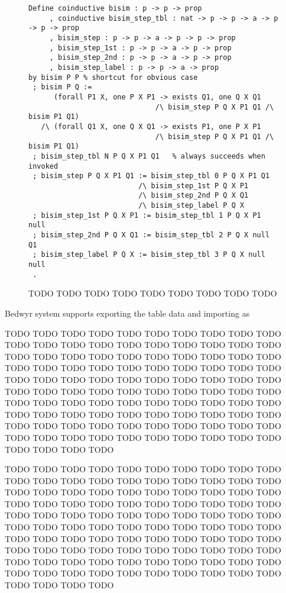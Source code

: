 \documentclass{llncs}
\begin{document}
\begin{figure}
\begin{lstlisting}
Define coinductive bisim : p -> p -> prop
     , coinductive bisim_step_tbl : nat -> p -> p -> a -> p -> p -> prop
     , bisim_step : p -> p -> a -> p -> p -> prop
     , bisim_step_1st : p -> p -> a -> p -> prop
     , bisim_step_2nd : p -> p -> a -> p -> prop
     , bisim_step_label : p -> p -> a -> prop
by bisim P P % shortcut for obvious case
 ; bisim P Q :=
      (forall P1 X, one P X P1 -> exists Q1, one Q X Q1
                              /\ bisim_step P Q X P1 Q1 /\ bisim P1 Q1)
   /\ (forall Q1 X, one Q X Q1 -> exists P1, one P X P1
                              /\ bisim_step P Q X P1 Q1 /\ bisim P1 Q1)
 ; bisim_step_tbl N P Q X P1 Q1   % always succeeds when invoked
 ; bisim_step P Q X P1 Q1 := bisim_step_tbl 0 P Q X P1 Q1
                          /\ bisim_step_1st P Q X P1
                          /\ bisim_step_2nd P Q X Q1
                          /\ bisim_step_label P Q X
 ; bisim_step_1st P Q X P1 := bisim_step_tbl 1 P Q X P1 null
 ; bisim_step_2nd P Q X Q1 := bisim_step_tbl 2 P Q X null Q1
 ; bisim_step_label P Q X := bisim_step_tbl 3 P Q X null null
 .
\end{lstlisting}
\vspace*{-2ex}
\caption{TODO TODO TODO TODO TODO TODO TODO TODO TODO}
\label{fig:ccsbisim}
\end{figure}

Bedwyr system supports exporting the table data and importing as

TODO TODO TODO TODO TODO TODO TODO TODO TODO TODO TODO TODO TODO
TODO TODO TODO TODO TODO TODO TODO TODO TODO TODO TODO TODO TODO
TODO TODO TODO TODO TODO TODO TODO TODO TODO TODO TODO TODO TODO
TODO TODO TODO TODO TODO TODO TODO TODO TODO TODO TODO TODO TODO
TODO TODO TODO TODO TODO TODO TODO TODO TODO TODO TODO TODO TODO
TODO TODO TODO TODO TODO TODO TODO TODO TODO TODO TODO TODO TODO
TODO TODO TODO TODO TODO TODO TODO TODO TODO TODO TODO TODO TODO
TODO TODO TODO TODO TODO TODO TODO TODO TODO TODO TODO TODO TODO

TODO TODO TODO TODO TODO TODO TODO TODO TODO TODO TODO TODO TODO
TODO TODO TODO TODO TODO TODO TODO TODO TODO TODO TODO TODO TODO
TODO TODO TODO TODO TODO TODO TODO TODO TODO TODO TODO TODO TODO
TODO TODO TODO TODO TODO TODO TODO TODO TODO TODO TODO TODO TODO
TODO TODO TODO TODO TODO TODO TODO TODO TODO TODO TODO TODO TODO
TODO TODO TODO TODO TODO TODO TODO TODO TODO TODO TODO TODO TODO
TODO TODO TODO TODO TODO TODO TODO TODO TODO TODO TODO TODO TODO
TODO TODO TODO TODO TODO TODO TODO TODO TODO TODO TODO TODO TODO
\end{document}
